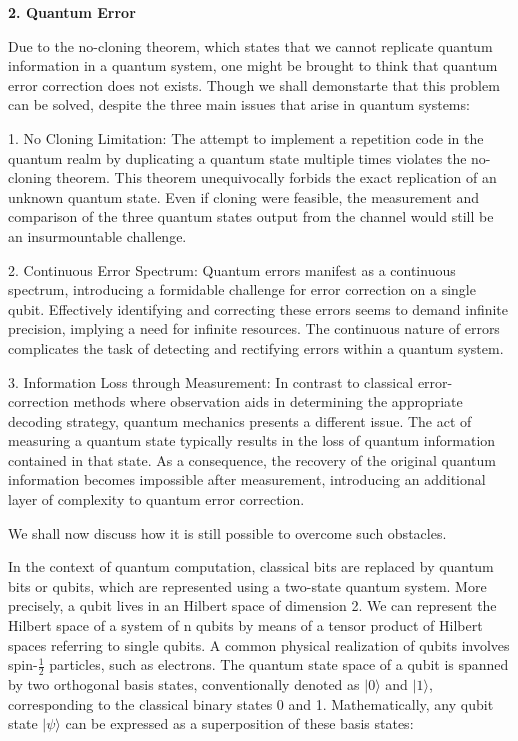 \documentclass[12pt]{report}
\begin{document}
	\begin{minipage}{1 \textwidth}
		
	\textbf{2. Quantum Error}\newline
		
		Due to the no-cloning theorem, which states that we cannot replicate quantum information in a quantum system, one might be brought to think that quantum error correction does not exists. Though we shall demonstarte that this problem can be solved, despite the three main issues that arise in quantum systems: \newline
		
		1. No Cloning Limitation: The attempt to implement a repetition code in the quantum realm by duplicating a quantum state multiple times violates the no-cloning theorem. This theorem unequivocally forbids the exact replication of an unknown quantum state. Even if cloning were feasible, the measurement and comparison of the three quantum states output from the channel would still be an insurmountable challenge.\newline
		
		2. Continuous Error Spectrum: Quantum errors manifest as a continuous spectrum, introducing a formidable challenge for error correction on a single qubit. Effectively identifying and correcting these errors seems to demand infinite precision, implying a need for infinite resources. The continuous nature of errors complicates the task of detecting and rectifying errors within a quantum system.\newline
		
		3. Information Loss through Measurement: In contrast to classical error-correction methods where observation aids in determining the appropriate decoding strategy, quantum mechanics presents a different issue. The act of measuring a quantum state typically results in the loss of quantum information contained in that state. As a consequence, the recovery of the original quantum information becomes impossible after measurement, introducing an additional layer of complexity to quantum error correction. \newline
		
		
		We shall now discuss how it is still possible to overcome such obstacles.\newline
		
		
		In the context of quantum computation, classical bits are replaced by quantum bits or qubits, which are represented using a two-state quantum system. More precisely, a qubit lives in an Hilbert space of dimension 2. We can represent the Hilbert space of a system of n qubits by means of a tensor product of Hilbert spaces referring to single qubits. A common physical realization of qubits involves spin-$\frac{1}{2}$ particles, such as electrons. The quantum state space of a qubit is spanned by two orthogonal basis states, conventionally denoted as $ |0 \rangle$ and $ |1 \rangle$, corresponding to the classical binary states 0 and 1. Mathematically, any qubit state 
		$ |\psi \rangle$ can be expressed as a superposition of these basis states:
		

\end{minipage}
\end{document}
